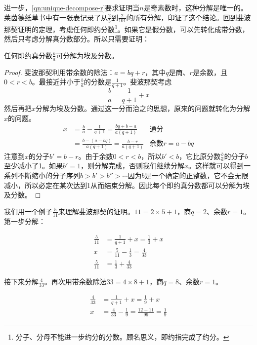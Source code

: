 \documentclass[b5paper]{ctexart}
\begin{document}
进一步，\cref{qn:unique-decompose-r}要求证明当$n$是奇素数时，这种分解是唯一的。莱茵德纸草书中有一张表记录了从$\frac{2}{5}$到$\frac{2}{101}$的所有分解，印证了这个结论。回到斐波那契证明的定理，考虑任何即约分数\footnote{分子、分母不能进一步约分的分数。顾名思义，即约指完成了约分。}。如果它是假分数，可以先转化成带分数，然后只考虑分解真分数部分。所以只需要证明：

\begin{theorem}[斐波那契]
任何即约真分数$\frac{b}{a}$可分解为埃及分数。
\end{theorem}

\begin{proof}
斐波那契利用带余数的除法：$a = bq + r$，其中$q$是商、$r$是余数，且$0 < r < b$。最接近并小于$\frac{b}{a}$的分数是$\frac{1}{q + 1}$。斐波那契考虑
\[
  \frac{b}{a} = \frac{1}{q + 1} + x
\]
然后再把$x$分解为埃及分数。通过这一分而治之的思想，原来的问题就转化为分解$x$的问题。
\begin{align*}
  x & = \frac{b}{a} - \frac{1}{q + 1} = \frac{bq + b - a}{a(q + 1)} & \text{通分} \\
    & = \frac{b - (a - bq)}{a(q+1)} = \frac{b - r}{a(q+1)} & \text{余数}r = a - bq
\end{align*}
注意到$x$的分子$b' = b - r$。由于余数$0 < r < b$，所以$b' < b$，它比原分数$\frac{b}{a}$的分子$b$至少减小了1。如果$b' = 1$，则分解完成，否则我们继续分解$x$。这样就可以得到一系列不断缩小的分子序列$b > b' > b'' > \cdots$因为$b$是一个确定的正整数，它不会无限减小，所以必定在某次达到1从而结束分解。因此每个即约真分数都可以分解为埃及分数。
\end{proof}

我们用一个例子$\frac{5}{11}$来理解斐波那契的证明。$11 = 2 \times 5 + 1$，商$q = 2$、余数$r = 1$。第一步分解：

\begin{align*}
\frac{5}{11} & = \frac{1}{q + 1} + x = \frac{1}{3} + x  \\
 x &= \frac{5}{11} - \frac{1}{3} = \frac{4}{33} \\
\frac{5}{11} &= \frac{1}{3} + \frac{4}{33}
\end{align*}

接下来分解$\frac{4}{33}$。再次用带余数除法$33 = 4 \times 8 + 1$，商$q = 8$、余数$r = 1$。

\begin{align*}
\frac{4}{33} & = \frac{1}{q + 1} + x = \frac{1}{9} + x  \\
 x &= \frac{4}{33} - \frac{1}{9} = \frac{12 - 11}{99} = \frac{1}{9}
\end{align*}
\end{document}
